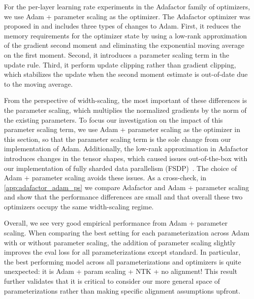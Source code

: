 \documentclass{article}
\theoremstyle{plain}
\theoremstyle{definition}
\theoremstyle{remark}
\begin{document}
For the per-layer learning rate experiments in the Adafactor family of optimizers, we use Adam + parameter scaling as the optimizer. The Adafactor optimizer was proposed in \citet{shazeer2018adafactor} and includes three types of changes to Adam. First, it reduces the memory requirements for the optimizer state by using a low-rank approximation of the gradient second moment and eliminating the exponential moving average on the first moment. Second, it introduces a parameter scaling term in the update rule. Third, it perform update clipping rather than gradient clipping, which stabilizes the update when the second moment estimate is out-of-date due to the moving average.

From the perspective of width-scaling, the most important of these differences is the parameter scaling, which multiplies the normalized gradients by the norm of the existing parameters. To focus our investigation on the impact of this parameter scaling term, we use Adam + parameter scaling as the optimizer in this section, so that the parameter scaling term is the sole change from our implementation of Adam. Additionally, the low-rank approximation in Adafactor introduces changes in the tensor shapes, which caused issues out-of-the-box with our implementation of fully sharded data parallelism (FSDP)~\citep{rajbhandari2020zero}. The choice of Adam + parameter scaling avoids these issues. As a cross-check, in \cref{app:adafactor_adam_ps} we compare Adafactor and Adam + parameter scaling and show that the performance differences are small and that overall these two optimizers occupy the same width-scaling regime.

Overall, we see very good empirical performance from Adam + parameter scaling. When comparing the best setting for each parameterization across Adam with or without parameter scaling, the addition of parameter scaling slightly improves the eval loss for all parameterizations except standard. In particular, the best performing model across all parameterizations and optimizers is quite unexpected: it is Adam + param scaling + NTK + no alignment! This result further validates that it is critical to consider our more general space of parameterizations rather than making specific alignment assumptions upfront.
\end{document}
